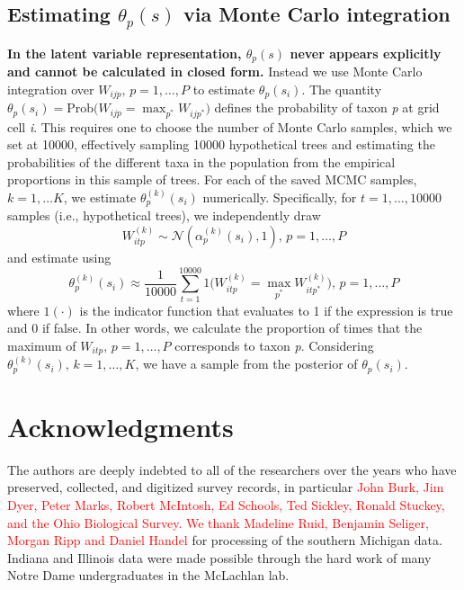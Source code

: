 \documentclass[10pt,letterpaper]{article}
\newcommand{\N}{\mathcal{N}}
\begin{document}
\subsection*{Estimating $\theta_{p}(s)$ via Monte Carlo integration}
\label{SI1}
{\bf In the latent variable representation, $\theta_{p}(s)$ never appears
explicitly and cannot be calculated in closed form.} Instead we use
Monte Carlo integration over $W_{ijp},\, p=1,\ldots,P$ to estimate
$\theta_{p}(s_{i})$. The quantity $\theta_{p}(s_{i})=\mbox{Prob}(W_{ijp}={\displaystyle \max_{p^{*}}W_{ijp^{*}})}$
defines the probability of taxon \emph{p} at grid cell \emph{i}. This requires
one to choose the number of Monte Carlo samples, which we set at 10000,
effectively sampling 10000 hypothetical trees and estimating the probabilities
of the different taxa in the population from the empirical proportions
in this sample of trees. For each of the saved MCMC samples, $k=1,\ldots K$,
we estimate $\theta_{p}^{(k)}(s_{i})$ numerically. Specifically,
for $t=1,\ldots,10000$ samples (i.e., hypothetical trees), we independently
draw
\[
W_{itp}^{(k)}\sim\N(\alpha_{p}^{(k)}(s_{i}),1),\, p=1,\ldots,P
\]
and estimate using 
\[
\theta_{p}^{(k)}(s_{i})\approx\frac{1}{10000}{\displaystyle \sum_{t=1}^{10000}1(W_{itp}^{(k)}={\displaystyle \max_{p^{*}}W_{itp^{*}}^{(k)})}},\, p=1,\ldots,P
\]
where $1(\cdot)$ is the indicator function that evaluates to 1 if
the expression is true and 0 if false. In other words, we calculate
the proportion of times that the maximum of $W_{itp},\, p=1,\ldots,P$
corresponds to taxon \emph{p}. Considering $\theta_{p}^{(k)}(s_{i}),\, k=1,\ldots,K$,
we have a sample from the posterior of $\theta_{p}(s_{i})$.

\section*{Acknowledgments}
The authors are deeply indebted to all of the researchers over the
years who have preserved, collected, and digitized survey records,
in particular \textcolor{red}{John Burk, Jim Dyer, Peter Marks, Robert McIntosh, Ed
Schools, Ted Sickley, Ronald Stuckey, and the Ohio Biological Survey.
We thank Madeline Ruid, Benjamin Seliger, Morgan Ripp and Daniel Handel}
for processing of the southern Michigan data. Indiana and Illinois
data were made possible through the hard work of many Notre Dame undergraduates
in the McLachlan lab. 
\end{document}
